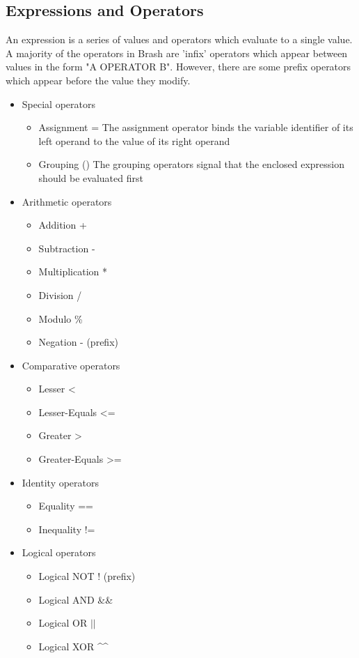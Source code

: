 \documentclass{article}
\begin{document}
\subsection{Expressions and Operators}
An expression is a series of values and operators which evaluate to a single value.
A majority of the operators in Brash are 'infix' operators which appear between values in the form "A OPERATOR B".
However, there are some prefix operators which appear before the value they modify.
\begin{itemize}
	\item Special operators
		\begin{itemize}
			\item Assignment = The assignment operator binds the variable identifier of its left operand to the value of its right operand
			\item Grouping () The grouping operators signal that the enclosed expression should be evaluated first
		\end{itemize}

	\item Arithmetic operators
		\begin{itemize}
			\item Addition +
			\item Subtraction -
			\item Multiplication *
			\item Division /
			\item Modulo \%
			\item Negation - (prefix)
		\end{itemize}

	\item Comparative operators
		\begin{itemize}
			\item Lesser \textless
			\item Lesser-Equals \textless=
			\item Greater \textgreater
			\item Greater-Equals \textgreater=
		\end{itemize}

	\item Identity operators
		\begin{itemize}
			\item Equality ==
			\item Inequality !=
		\end{itemize}

	\item Logical operators
		\begin{itemize}
			\item Logical NOT ! (prefix)
			\item Logical AND \&\&
			\item Logical OR $||$
			\item Logical XOR \^{}\^{}
		\end{itemize}
\end{itemize}
\end{document}
